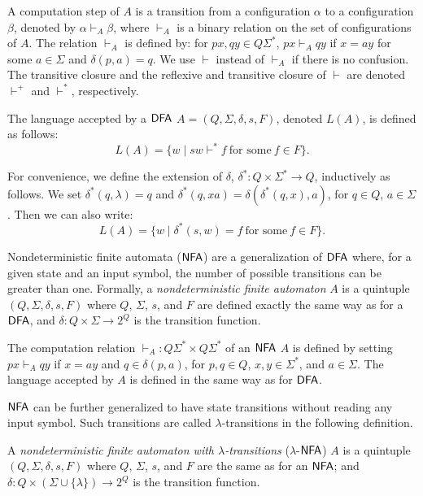 A computation step of $A$ is a transition from a configuration $\alpha$ to a configuration $\beta$, denoted by $\alpha \vdash_A \beta$, where $\vdash_A$ is a binary relation on the set of configurations of $A$. The relation $\vdash_A$ is defined by: for $px, qy \in Q \Sigma^*$, $px \vdash_A qy$ if $x = ay$ for some $a \in \Sigma$ and $\delta(p, a) = q$. We use $\vdash$ instead of $\vdash_A$ if there is no confusion. The transitive closure and the reflexive and transitive closure of $\vdash$ are denoted $\vdash^+$ and $\vdash^*$, respectively.

The language accepted by a \index{$\DFA$}$\DFA$ $A = (Q, \Sigma, \delta, s, F)$, denoted $L(A)$, is defined as follows:
$$L(A) = \{w \mid sw \vdash^* f \ \text{for some} \ f \in F\}.$$

For convenience, we define the extension of $\delta$, $\delta^*: Q \times \Sigma^* \to Q$, inductively as follows. We set $\delta^*(q, \lambda) = q$ and $\delta^*(q, xa) = \delta(\delta^*(q, x), a)$, for $q \in Q$, $a \in \Sigma$. Then we can also write:
$$L(A) = \{w \mid \delta^*(s, w) = f \ \text{for some} \ f \in F\}.$$

Nondeterministic finite automata \index{$\NFA$}($\NFA$) are a generalization of \index{$\DFA$}$\DFA$ where, for a given state and an input symbol, the number of possible transitions can be greater than one. Formally, a  \emph{nondeterministic finite automaton} $A$ is a quintuple $(Q, \Sigma, \delta, s, F)$ where $Q$, $\Sigma$, $s$, and $F$ are defined exactly the same way as for a \index{$\DFA$}$\DFA$, and $\delta: Q \times \Sigma \to 2^Q$ is the transition function.

The computation relation $\vdash_A: Q \Sigma^* \times Q \Sigma^*$ of an \index{$\NFA$}$\NFA$ $A$ is defined by setting $px \vdash_A qy$ if $x = ay$ and $q \in \delta(p, a)$, for $p, q \in Q$, $x, y \in \Sigma^*$, and $a \in \Sigma$. The language accepted by $A$ is defined in the same way as for \index{$\DFA$}$\DFA$.

\index{$\NFA$}$\NFA$ can be further generalized to have state transitions without reading any input symbol. Such transitions are called  $\lambda$-transitions in the following definition.

A \emph{nondeterministic finite automaton with $\lambda$-transitions} \index{$\lambda$-$\NFA$}($\lambda$-$\NFA$) $A$ is a quintuple $(Q, \Sigma, \delta, s, F)$ where $Q$, $\Sigma$, $s$, and $F$ are the same as for an \index{$\NFA$}$\NFA$; and $\delta: Q \times (\Sigma \cup \{\lambda\}) \to 2^Q$ is the transition function.

